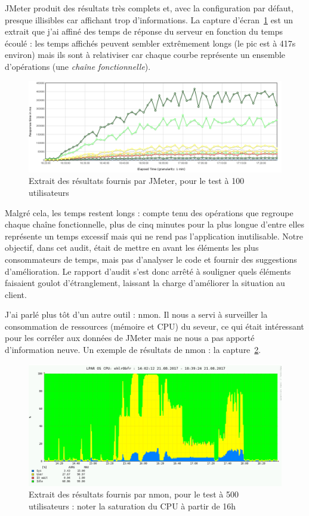 JMeter produit des résultats très complets et, avec la configuration par défaut, presque illisibles car affichant trop d'informations. La capture d'écran~\ref{fig:jmeter_res} est un extrait que j'ai affiné des temps de réponse du serveur en fonction du temps écoulé : les temps affichés peuvent sembler extrêmement longs (le pic est à 417s environ) mais ils sont à relativiser car chaque courbe représente un ensemble d'opérations (une \emph{chaîne fonctionnelle}). 

\begin{figure}
  \centering
  \caption{Extrait des résultats fournis par JMeter, pour le test à 100 utilisateurs}
  \label{fig:jmeter_res}
  \includegraphics[width=\textwidth]{images/jmeter_res}
\end{figure}

Malgré cela, les temps restent longs : compte tenu des opérations que regroupe chaque chaîne fonctionnelle, plus de cinq minutes pour la plus longue d'entre elles représente un temps excessif mais qui ne rend pas l'application inutilisable. Notre objectif, dans cet audit, était de mettre en avant les éléments les plus consommateurs de temps, mais pas d'analyser le code et fournir des suggestions d'amélioration. Le rapport d'audit s'est donc arrêté à souligner quels éléments faisaient goulot d'étranglement, laissant la charge d'améliorer la situation au client. 

J'ai parlé plus tôt d'un autre outil : nmon. Il nous a servi à surveiller la consommation de ressources (mémoire et CPU) du seveur, ce qui était intéressant pour les corréler aux données de JMeter mais ne nous a pas apporté d'information neuve. Un exemple de résultats de nmon : la capture~\ref{fig:nmon_res}.

\begin{figure}
  \centering
  \caption{Extrait des résultats fournis par nmon, pour le test à 500 utilisateurs : noter la saturation du CPU à partir de 16h}
  \label{fig:nmon_res}
  \includegraphics[width=\textwidth]{images/nmon_res}
\end{figure}


